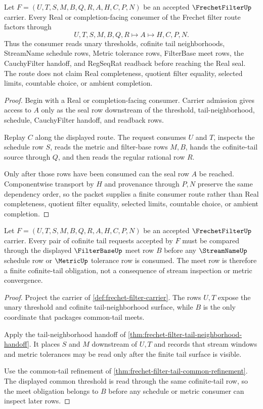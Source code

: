 \begin{theorem}
\label{thm:frechet-filter-real-completion-consumer-route}
Let $F=(U,T,S,M,B,Q,R,A,H,C,P,N)$ be an accepted $\FrechetFilterUp$ carrier. Every Real or completion-facing consumer of the Frechet filter route factors through
$$
U,T,S,M,B,Q,R \longmapsto A \longmapsto H,C,P,N .
$$
Thus the consumer reads unary thresholds, cofinite tail neighborhoods, StreamName schedule rows, Metric tolerance rows, FilterBase meet rows, the CauchyFilter handoff, and RegSeqRat readback before reaching the Real seal. The route does not claim Real completeness, quotient filter equality, selected limits, countable choice, or ambient completion.
\end{theorem}
\begin{proof}
Begin with a Real or completion-facing consumer. Carrier admission gives access to $A$ only as the seal row downstream of the threshold, tail-neighborhood, schedule, CauchyFilter handoff, and readback rows.

Replay $C$ along the displayed route. The request consumes $U$ and $T$, inspects the schedule row $S$, reads the metric and filter-base rows $M,B$, hands the cofinite-tail source through $Q$, and then reads the regular rational row $R$.

Only after those rows have been consumed can the seal row $A$ be reached. Componentwise transport by $H$ and provenance through $P,N$ preserve the same dependency order, so the packet supplies a finite consumer route rather than Real completeness, quotient filter equality, selected limits, countable choice, or ambient completion.
\end{proof}

\begin{theorem}
\label{thm:frechet-filter-filterbase-meet-obligation}
Let $F=(U,T,S,M,B,Q,R,A,H,C,P,N)$ be an accepted $\FrechetFilterUp$ carrier. Every pair of cofinite tail requests accepted by $F$ must be compared through the displayed $\FilterBaseUp$ meet row $B$ before any $\StreamNameUp$ schedule row or $\MetricUp$ tolerance row is consumed. The meet row is therefore a finite cofinite-tail obligation, not a consequence of stream inspection or metric convergence.
\end{theorem}
\begin{proof}
Project the carrier of \autoref{def:frechet-filter-carrier}. The rows $U,T$ expose the unary threshold and cofinite tail-neighborhood surface, while $B$ is the only coordinate that packages common-tail meets.

Apply the tail-neighborhood handoff of \autoref{thm:frechet-filter-tail-neighborhood-handoff}. It places $S$ and $M$ downstream of $U,T$ and records that stream windows and metric tolerances may be read only after the finite tail surface is visible.

Use the common-tail refinement of \autoref{thm:frechet-filter-tail-common-refinement}. The displayed common threshold is read through the same cofinite-tail row, so the meet obligation belongs to $B$ before any schedule or metric consumer can inspect later rows.
\end{proof}

